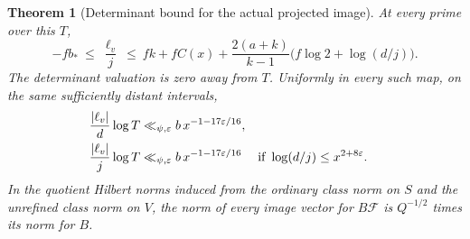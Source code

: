 \documentclass[a4paper,11pt]{article}
\newtheorem{theorem}[proposition]{Theorem}
\theoremstyle{definition}
\theoremstyle{remark}
\numberwithin{equation}{section}
\begin{document}
\begin{theorem}[Determinant bound for the actual projected image]\leavevmode
\label{thm:imagedet355}
At every prime over this \(T\),
\[
 -f b_* \ \le\ \frac{\ell_v}{j}\
 \le\ fk+f C(x)
        +\frac{2(a+k)}{k-1}\bigl(f\log 2+\log(d/j)\bigr).
\]
The determinant valuation is zero away from \(T\). Uniformly in
every such map, on the same sufficiently distant intervals,
\[
 \begin{aligned}
   \frac{|\ell_v|}{d}\log T
       &\ll_{\psi,\varepsilon} b\,x^{-1-17\varepsilon/16},\\
   \frac{|\ell_v|}{j}\log T
       &\ll_{\psi,\varepsilon} b\,x^{-1-17\varepsilon/16}
              &&\text{if }\log(d/j)\le x^{2+8\varepsilon}.
 \end{aligned}
\]
In the quotient Hilbert norms induced from the ordinary class
norm on \(S\) and the unrefined class norm on \(V\), the norm
of every image vector for \(B\mathcal F\) is \(Q^{-1/2}\)
times its norm for \(B\).
\end{theorem}
\end{document}
